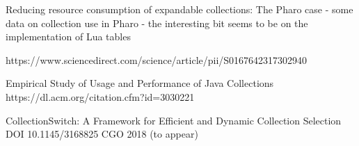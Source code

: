 \documentclass[sigconf, 10pt, review]{acmart}
\begin{document}
\begin{note}
Reducing resource consumption of expandable collections: The Pharo case
- some data on collection use in Pharo
- the interesting bit seems to be on the implementation of Lua tables

https://www.sciencedirect.com/science/article/pii/S0167642317302940

Empirical Study of Usage and Performance of Java Collections
https://dl.acm.org/citation.cfm?id=3030221


CollectionSwitch: A Framework for Efficient and Dynamic Collection Selection
DOI 10.1145/3168825
CGO 2018 (to appear)








\end{note} 

% 



\end{document}
